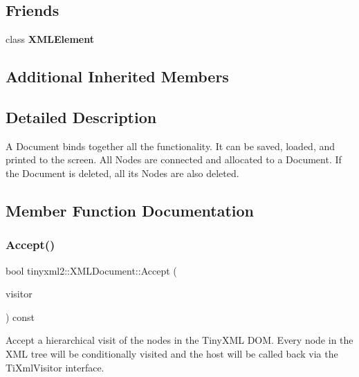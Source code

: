 \subsection*{Friends}
\begin{DoxyCompactItemize}
\item 
\mbox{\label{classtinyxml2_1_1XMLDocument_afda4b2e340326fca89dc9edbd505cb3b}} 
class {\bfseries X\+M\+L\+Element}
\end{DoxyCompactItemize}
\subsection*{Additional Inherited Members}


\subsection{Detailed Description}
A Document binds together all the functionality. It can be saved, loaded, and printed to the screen. All Nodes are connected and allocated to a Document. If the Document is deleted, all its Nodes are also deleted. 

\subsection{Member Function Documentation}
\mbox{\label{classtinyxml2_1_1XMLDocument_ab7be651917a35ab1ff0e4e6d4e565cdf}} 
\subsubsection{\texorpdfstring{Accept()}{Accept()}\hspace{0.1cm}{\footnotesize\ttfamily [1/2]}}
{\footnotesize\ttfamily bool tinyxml2\+::\+X\+M\+L\+Document\+::\+Accept (\begin{DoxyParamCaption}\item[{\hyperlink{classtinyxml2_1_1XMLVisitor}{X\+M\+L\+Visitor} $\ast$}]{visitor }\end{DoxyParamCaption}) const\hspace{0.3cm}{\ttfamily [virtual]}}

Accept a hierarchical visit of the nodes in the Tiny\+X\+ML D\+OM. Every node in the X\+ML tree will be conditionally visited and the host will be called back via the Ti\+Xml\+Visitor interface.

